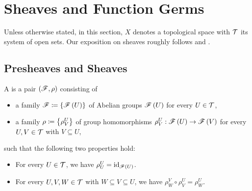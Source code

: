 \documentclass[../Moduli_Spaces_of_Riemann_Surfaces.tex]{subfiles}
\begin{document}
    \section{Sheaves and Function Germs}
    Unless otherwise stated, in this section, $X$ denotes a topological space with $\mathcal{T}$ its system of open sets. Our exposition on sheaves roughly follows \cite[][Section 6]{forster} and \cite[][Chapter IX]{miranda}.
    \subsection{Presheaves and Sheaves}
    \begin{definition}
        A  is a pair $\left(\mathscr{F},\rho\right)$ consisting of
        \begin{itemize}
            \item a family $\mathscr{F}\coloneqq\left\{\mathscr{F}\left(U\right)\right\}$ of Abelian groups $\mathscr{F}\left(U\right)$ for every $U\in\mathcal{T}$,
                \vspace{-0.05in}
            \item a family $\rho\coloneqq\left\{\rho^U_V\right\}$ of group homomorphisms $\rho^U_V:\mathscr{F}\left(U\right)\to\mathscr{F}\left(V\right)$ for every $U,V\in\mathcal{T}$ with $V\subseteq U$,
        \end{itemize}
        such that the following two properties hold:
        \begin{itemize}
            \item For every $U\in\mathcal{T}$, we have $\rho^U_U=\operatorname{id}_{\mathscr{F}\left(U\right)}$.
                \vspace{-0.05in}
            \item For every $U,V,W\in\mathcal{T}$ with $W\subseteq V\subseteq U$, we have $\rho^V_W\circ\rho^U_V=\rho^U_W$.
        \end{itemize}
    \end{definition}
\end{document}
